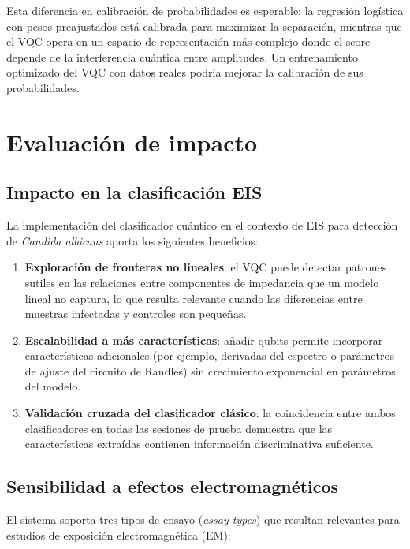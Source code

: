 \documentclass[11pt,a4paper,spanish]{book}
\begin{document}
Esta diferencia en calibraci\'{o}n de probabilidades es esperable: la regresi\'{o}n log\'{i}stica con pesos preajustados est\'{a} calibrada para maximizar la separaci\'{o}n, mientras que el VQC opera en un espacio de representaci\'{o}n m\'{a}s complejo donde el score depende de la interferencia cu\'{a}ntica entre amplitudes. Un entrenamiento optimizado del VQC con datos reales podr\'{i}a mejorar la calibraci\'{o}n de sus probabilidades.

\section{Evaluaci\'{o}n de impacto}

\subsection{Impacto en la clasificaci\'{o}n EIS}

La implementaci\'{o}n del clasificador cu\'{a}ntico en el contexto de EIS para detecci\'{o}n de \textit{Candida albicans} aporta los siguientes beneficios:

\begin{enumerate}
	\item \textbf{Exploraci\'{o}n de fronteras no lineales}: el VQC puede detectar patrones sutiles en las relaciones entre componentes de impedancia que un modelo lineal no captura, lo que resulta relevante cuando las diferencias entre muestras infectadas y controles son peque\~{n}as.
	\item \textbf{Escalabilidad a m\'{a}s caracter\'{i}sticas}: a\~{n}adir qubits permite incorporar caracter\'{i}sticas adicionales (por ejemplo, derivadas del espectro o par\'{a}metros de ajuste del circuito de Randles) sin crecimiento exponencial en par\'{a}metros del modelo.
	\item \textbf{Validaci\'{o}n cruzada del clasificador cl\'{a}sico}: la coincidencia entre ambos clasificadores en todas las sesiones de prueba demuestra que las caracter\'{i}sticas extra\'{i}das contienen informaci\'{o}n discriminativa suficiente.
\end{enumerate}

\subsection{Sensibilidad a efectos electromagn\'{e}ticos}

El sistema soporta tres tipos de ensayo (\textit{assay types}) que resultan relevantes para estudios de exposici\'{o}n electromagn\'{e}tica (EM):
\end{document}

